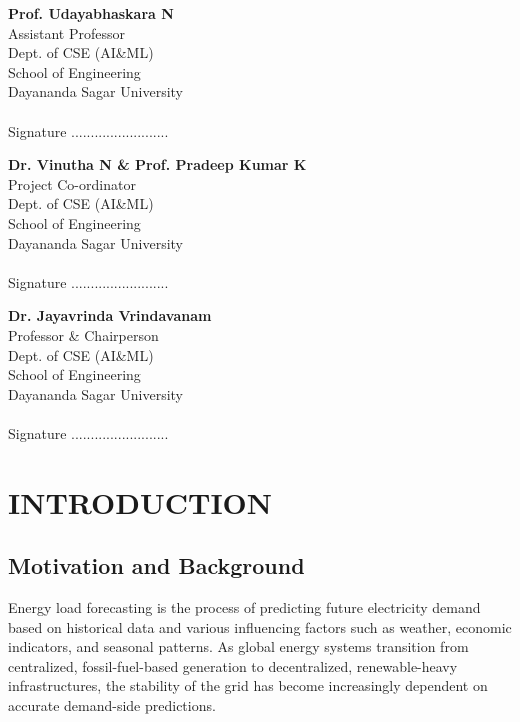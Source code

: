 \documentclass[12pt,a4paper,twoside,fleqn]{report}
\begin{document}
\vspace{15mm}
\noindent
\begin{minipage}[t]{0.31\textwidth}
\small
  \textbf{Prof. Udayabhaskara N}\\
  Assistant Professor\\
  Dept. of CSE (AI\&ML)\\
  School of Engineering\\
  Dayananda Sagar University\\
  \\
  Signature .........................\\
\end{minipage}%
\hfill
\begin{minipage}[t]{0.31\textwidth}
\small
  \textbf{Dr. Vinutha N \& Prof. Pradeep Kumar K}\\
  Project Co-ordinator\\
  Dept. of CSE (AI\&ML)\\
  School of Engineering\\
  Dayananda Sagar University\\
  \\
  Signature .........................\\
\end{minipage}%
\hfill
\begin{minipage}[t]{0.34\textwidth}
\small
  \textbf{Dr. Jayavrinda Vrindavanam}\\
  Professor \& Chairperson\\
  Dept. of CSE (AI\&ML)\\
  School of Engineering\\
  Dayananda Sagar University \\
  \\
  Signature .........................\\
\end{minipage}

\newpage
\pagestyle{plain}
\tableofcontents
\newpage
\listoffigures
\newpage
\listoftables
\newpage
{}
\pagestyle{combined}

\chapter{INTRODUCTION}
\section{Motivation and Background}
Energy load forecasting is the process of predicting future electricity demand based on historical data and various influencing factors such as weather, economic indicators, and seasonal patterns. As global energy systems transition from centralized, fossil-fuel-based generation to decentralized, renewable-heavy infrastructures, the stability of the grid has become increasingly dependent on accurate demand-side predictions. 
\end{document}
